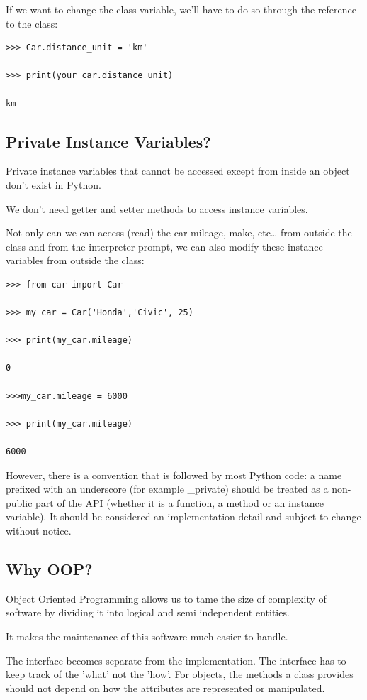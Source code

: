 \documentclass{article}
\begin{document}
If we want to change the class variable, we’ll have to do so through the reference to the class:

\begin{lstlisting}
>>> Car.distance_unit = 'km'

>>> print(your_car.distance_unit)

km
\end{lstlisting}

\subsection{Private Instance Variables?}

Private instance variables that cannot be accessed except from inside an object don’t exist in Python.

We don’t need getter and setter methods to access instance variables.

Not only can we can access (read)  the car mileage, make, etc… from outside the class and from the interpreter prompt, we can also modify these instance variables from outside the class:

\begin{lstlisting}
>>> from car import Car

>>> my_car = Car('Honda','Civic', 25)

>>> print(my_car.mileage)

0

>>>my_car.mileage = 6000

>>> print(my_car.mileage)

6000
\end{lstlisting}

However, there is a convention that is followed by most Python code: a name prefixed with an underscore (for example  {\_}private) should be treated as a non-public part of the API (whether it is a function, a method or an instance variable).  It should be considered an implementation detail and subject to change without notice.

\subsection{Why OOP?}

Object Oriented Programming allows us to tame the size of complexity of software by dividing it into logical and semi independent entities.

It makes the maintenance of this software much easier to handle.

The interface becomes separate from the implementation. The interface has to keep track of the 'what' not the 'how'.  For objects, the methods a class provides should not depend on how the attributes are represented or manipulated. 
\end{document}
